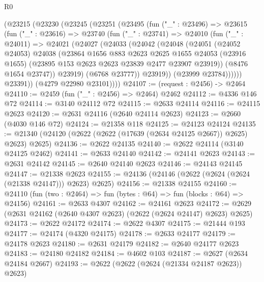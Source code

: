 \begin{lexlean}{R0}
\begin{coremodule}
      (@23215
        (@23230
          (@23245
            (@23251
              (@23495
                (fun ("_" : @23496) =>
                @23615
                  (fun ("_" : @23616) =>
                  @23740
                    (fun ("_" : @23741) =>
                    @24010
                      (fun ("_" : @24011) =>
                      @24021
                        (@24027
                          (@24033
                            (@24042
                              (@24048
                                (@24051
                                  (@24052 @24053)
                                  @24038
                                  (@23864
                                    @1656
                                    @883
                                    @2623
                                    @2625
                                    @1655
                                    @24053
                                    (@23916 @1655)
                                    (@23895 @153 @2623 @2623 @23839 @2477 @23907 @23919))
                                  (@8476 @1654 @23747))
                                @23919)
                              (@6768 @23777))
                            @23919))
                        (@23999 @23784))))))
              @23391))
          (@4279 @22980 @23101))))
@24107 := (request : @2456) -> @2464
@24110 := @2459 (fun ("_" : @2456) => @2464) @2462
@24112 := @4336 @146 @72
@24114 := @3140 @24112 @72
@24115 := @2633 @24114
@24116 := @24115 @2623
@24120 := @2631 @24116 (@2640 @24114 @2623)
@24123 := @2660 (@4030 @146 @72)
@24124 := @21358 @118
@24125 := @24123 @24124
@24135 := @21340 (@24120 (@2622 (@2622 (@17639 (@2634 @24125 @2667)) @2625) @2623) @2625)
@24136 := @2622 @24135
@24140 := @2622 @24114 (@3140 @24125 @2462)
@24141 := @2633 @24140
@24142 := @24141 @2623
@24143 := @2631 @24142
@24145 := @2640 @24140 @2623
@24146 := @24143 @24145
@24147 := @21338 @2623
@24155 := @24136 (@24146 (@2622 (@2624 (@2624 (@21338 @24147))) @2623) @2625)
@24156 := @21338 @24155
@24160 := @24110 (fun (two : @2464) => fun (bytes : @64) => fun (blocks : @64) => @24156)
@24161 := @2633 @4307
@24162 := @24161 @2623
@24172 := @2629 (@2631 @24162 (@2640 @4307 @2623) (@2622 (@2624 @24147) @2623) @2625)
@24173 := @2622 @24172
@24174 := @2622 @4307
@24175 := @21444 @193
@24177 := @24174 (@4320 @24175)
@24178 := @2633 @24177
@24179 := @24178 @2623
@24180 := @2631 @24179
@24182 := @2640 @24177 @2623
@24183 := @24180 @24182
@24184 := @4602 @103
@24187 := @2627 (@2634 @24184 @2667)
@24193 := @2622 (@2622 (@2624 (@21334 @24187 @2623)) @2623)

\end{coremodule}
\end{lexlean}
